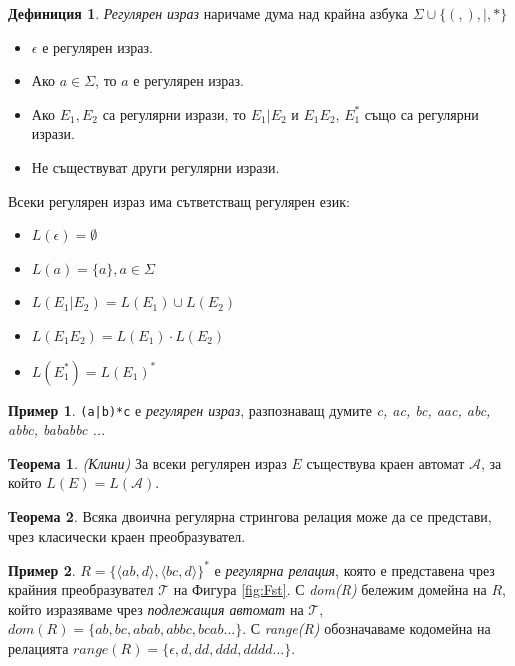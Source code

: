 \documentclass[12pt, oneside]{article}
\theoremstyle{definition}
\newtheorem{definition}{Дефиниция}[section]
\newtheorem{theorem}{Теорема}[section]
\newtheorem{example}{Пример}[section]
\begin{document}
\begin{definition} 
	\emph{Регулярен израз} наричаме дума над крайна азбука \( \Sigma \cup \{ (, ), \vert, * \} \)
	\begin{itemize}
		\item \( \epsilon \) е регулярен израз.
		\item Ако \( a \in \Sigma \), то \( a \) е регулярен израз.
		\item Ако \( E_1, E_2 \) са регулярни изрази, то \( E_1 | E_2 \) и \( E_1 E_2 \), \( E_1^* \) също са регулярни изрази.
		\item Не съществуват други регулярни изрази.
	\end{itemize}
	Всеки регулярен израз има сътветстващ регулярен език:
	\begin{itemize}
		\item \( L(\epsilon) = \emptyset \)
		\item \( L(a) = \{ a \}, a \in \Sigma \)
		\item \( L(E_1 | E_2) = L(E_1) \cup L(E_2) \)
		\item \( L(E_1 E_2) = L(E_1) \cdot L(E_2) \)
		\item \( L(E_1^*) = L(E_1)^* \)
	\end{itemize}
\end{definition}

\begin{example}
	\verb/(a|b)*c/ е \emph{регулярен израз}, разпознаващ думите \emph{c, ac, bc, aac, abc, abbc, bababbc ...}
\end{example}

\begin{theorem}{\emph{(Клини)}}
	За всеки регулярен израз \( E \) съществува краен автомат \( \mathcal{A} \), за който \( L(E) = L(\mathcal{A})\).
\end{theorem}

\begin{theorem}
	Всяка двоична регулярна стрингова релация може да се представи, чрез класически краен преобразувател.
\end{theorem}

\begin{example}
	\( R = \{ \langle ab, d \rangle, \langle bc, d \rangle \}^* \) е \emph{регулярна релация}, която е представена чрез крайния преобразувател \(\mathcal{T}\) на Фигура \ref{fig:Fst}. С \emph{dom(R)} бележим домейна на \(R\), който изразяваме чрез \emph{подлежащия автомат} на \( \mathcal{T} \), \( dom(R) =  \{ ab, bc, abab, abbc, bcab \dots \} \). С \emph{range(R)} обозначаваме кодомейна на релацията \( range(R) =  \{ \epsilon, d, dd, ddd, dddd \dots \} \).
\end{example}
\end{document}
